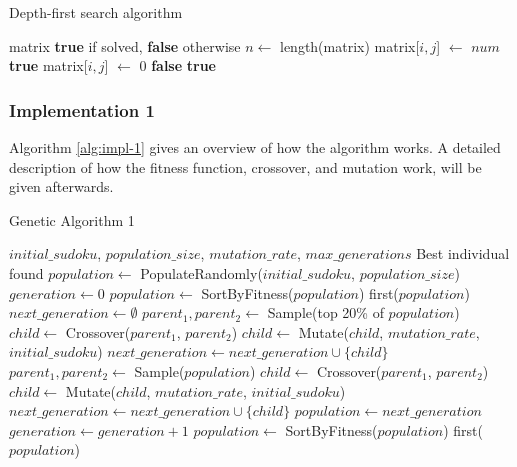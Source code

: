 \begin{algorithm}[H]
\caption{Depth-first search algorithm}\label{alg:dfs}
\begin{algorithmic}
\Require matrix
\Ensure \textbf{true} if solved, \textbf{false} otherwise
\State $n \gets$ length(matrix)
          \State matrix[$i,j$] $\gets$ $num$
           \State \Return \textbf{true} \EndIf
          \State matrix[$i,j$] $\gets$ 0
        \EndIf
      \EndFor
      \State \Return \textbf{false}
    \EndIf
  \EndFor
\EndFor
\State \Return \textbf{true}
\end{algorithmic}
\end{algorithm}

\pagebreak %
\subsubsection{Implementation 1}\label{sec:impl-1}

Algorithm \ref{alg:impl-1} gives an overview of how the algorithm works. A detailed description of how the fitness function, crossover, and mutation work, will be given afterwards.

\begin{algorithm}[H]
\caption{Genetic Algorithm 1}\label{alg:impl-1}
\begin{algorithmic}
\Require $initial\_sudoku$, $population\_size$, $mutation\_rate$, $max\_generations$
\Ensure Best individual found
\State $population \gets$ PopulateRandomly($initial\_sudoku$, $population\_size$)
\State $generation \gets 0$
  \State $population \gets$ SortByFitness($population$) 
    \State \Return first($population$)
  \EndIf
  \State $next\_generation \gets \emptyset$
    \State $parent_1, parent_2 \gets$ Sample(top 20\% of $population$)
    \State $child \gets$ Crossover($parent_1$, $parent_2$)
    \State $child \gets$ Mutate($child$, $mutation\_rate$, $initial\_sudoku$)
    \State $next\_generation \gets next\_generation \cup \{child\}$
  \EndFor
    \State $parent_1, parent_2 \gets$ Sample($population$)
    \State $child \gets$ Crossover($parent_1$, $parent_2$)
    \State $child \gets$ Mutate($child$, $mutation\_rate$, $initial\_sudoku$)
    \State $next\_generation \gets next\_generation \cup \{child\}$
  \EndFor
  \State $population \gets next\_generation$
  \State $generation \gets generation + 1$
\EndWhile
\State $population \gets$ SortByFitness($population$) 
\State \Return first($population$)
\end{algorithmic}
\end{algorithm}


